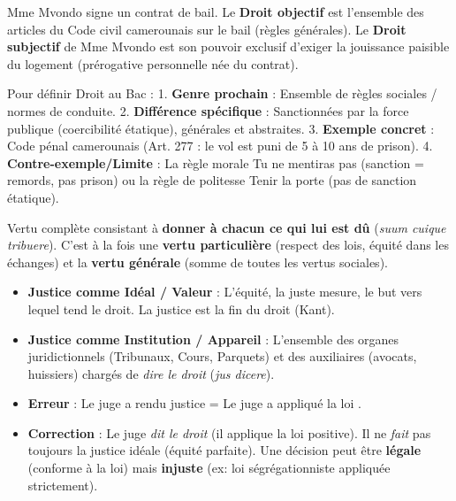 \documentclass[11pt]{article}
\newcounter{popsec}
\newcounter{popsub}
\newcommand{\courssub}[1]{%
  \stepcounter{popsub}%
  \par\vspace{9pt}\noindent{\popxbold\fontsize{11.5}{13}\selectfont\color{popink}{\color{poporange}\thepopsec.\thepopsub}\hspace{6pt}#1}\par\nopagebreak\vspace{4pt}
}
\begin{document}
\begin{exemplebox}
Mme Mvondo signe un contrat de bail. Le \textbf{Droit objectif} est l'ensemble des articles du Code civil camerounais sur le bail (règles générales). Le \textbf{Droit subjectif} de Mme Mvondo est son pouvoir exclusif d'exiger la jouissance paisible du logement (prérogative personnelle née du contrat).
\end{exemplebox}

\begin{methode}
Pour définir \og Droit \fg{} au Bac :
1. \textbf{Genre prochain} : Ensemble de règles sociales / normes de conduite.
2. \textbf{Différence spécifique} : Sanctionnées par la force publique (coercibilité étatique), générales et abstraites.
3. \textbf{Exemple concret} : Code pénal camerounais (Art. 277 : le vol est puni de 5 à 10 ans de prison).
4. \textbf{Contre-exemple/Limite} : La règle morale \og Tu ne mentiras pas \fg{} (sanction = remords, pas prison) ou la règle de politesse \og Tenir la porte \fg{} (pas de sanction étatique).
\end{methode}

\courssub{La Justice : vertu, institution et idéal}

\begin{definition}
Vertu complète consistant à \textbf{donner à chacun ce qui lui est dû} (\emph{suum cuique tribuere}). C'est à la fois une \textbf{vertu particulière} (respect des lois, équité dans les échanges) et la \textbf{vertu générale} (somme de toutes les vertus sociales).
\end{definition}

\begin{aretenir}
\begin{itemize}
    \item \textbf{Justice comme Idéal / Valeur} : L'équité, la juste mesure, le but vers lequel tend le droit. \og La justice est la fin du droit \fg{} (Kant).
    \item \textbf{Justice comme Institution / Appareil} : L'ensemble des organes juridictionnels (Tribunaux, Cours, Parquets) et des auxiliaires (avocats, huissiers) chargés de \emph{dire le droit} (\emph{jus dicere}).
\end{itemize}
\end{aretenir}

\begin{attention}
\begin{itemize}
    \item \textbf{Erreur} : \og Le juge a rendu justice \fg{} = \og Le juge a appliqué la loi \fg{}.
    \item \textbf{Correction} : Le juge \emph{dit le droit} (il applique la loi positive). Il ne \emph{fait} pas toujours la justice idéale (équité parfaite). Une décision peut être \textbf{légale} (conforme à la loi) mais \textbf{injuste} (ex: loi ségrégationniste appliquée strictement).
\end{itemize}
\end{attention}
\end{document}
